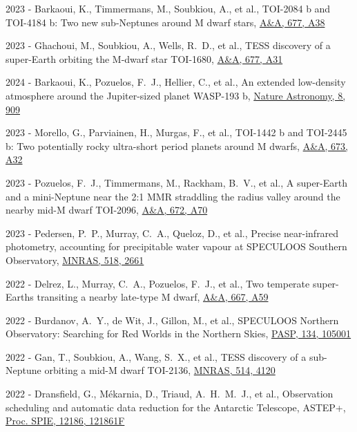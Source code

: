 \documentclass[10pt,letterpaper]{article}
\newcommand{\publi}[4]{\item #1 - #3, #2, #4}
\newcommand{\mnras}{MNRAS}
\newcommand{\aap}{A\&A}
\newcommand{\procspie}{Proc. SPIE}
\newcommand{\pasp}{PASP}
\begin{document}
\begin{etaremune}
    \publi{2023}{TOI-2084 b and TOI-4184 b: Two new sub-Neptunes around M dwarf stars}
    {Barkaoui, K., Timmermans, M., Soubkiou, A., et al.}
    {\href{https://ui.adsabs.harvard.edu/abs/2023A\&A...677A..38B}{\aap, 677, A38}}
    
    \publi{2023}{TESS discovery of a super-Earth orbiting the M-dwarf star TOI-1680}
    {Ghachoui, M., Soubkiou, A., Wells, R.~D., et al.}
    {\href{https://ui.adsabs.harvard.edu/abs/2023A\&A...677A..31G}{\aap, 677, A31}}
    
    \publi{2024}{An extended low-density atmosphere around the Jupiter-sized planet WASP-193 b}
    {Barkaoui, K., Pozuelos, F.~J., Hellier, C., et al.}
    {\href{https://ui.adsabs.harvard.edu/abs/2024NatAs...8..909B}{Nature Astronomy, 8, 909}}
        
    \publi{2023}{TOI-1442 b and TOI-2445 b: Two potentially rocky ultra-short period planets around M dwarfs}
    {Morello, G., Parviainen, H., Murgas, F., et al.}
    {\href{https://ui.adsabs.harvard.edu/abs/2023A\&A...673A..32M}{\aap, 673, A32}}
    
    \publi{2023}{A super-Earth and a mini-Neptune near the 2:1 MMR straddling the radius valley around the nearby mid-M dwarf TOI-2096}
    {Pozuelos, F.~J., Timmermans, M., Rackham, B.~V., et al.}
    {\href{https://ui.adsabs.harvard.edu/abs/2023A\&A...672A..70P}{\aap, 672, A70}}
    
    \publi{2023}{Precise near-infrared photometry, accounting for precipitable water vapour at SPECULOOS Southern Observatory}
    {Pedersen, P.~P., Murray, C.~A., Queloz, D., et al.}
    {\href{https://ui.adsabs.harvard.edu/abs/2023MNRAS.518.2661P}{\mnras, 518, 2661}}
    
    \publi{2022}{Two temperate super-Earths transiting a nearby late-type M dwarf}
    {Delrez, L., Murray, C.~A., Pozuelos, F.~J., et al.}
    {\href{https://ui.adsabs.harvard.edu/abs/2022A\&A...667A..59D}{\aap, 667, A59}}
    
    \publi{2022}{SPECULOOS Northern Observatory: Searching for Red Worlds in the Northern Skies}
    {Burdanov, A.~Y., de Wit, J., Gillon, M., et al.}
    {\href{https://ui.adsabs.harvard.edu/abs/2022PASP..134j5001B}{\pasp, 134, 105001}}
    
    \publi{2022}{TESS discovery of a sub-Neptune orbiting a mid-M dwarf TOI-2136}
    {Gan, T., Soubkiou, A., Wang, S.~X., et al.}
    {\href{https://ui.adsabs.harvard.edu/abs/2022MNRAS.514.4120G}{\mnras, 514, 4120}}
    
    \publi{2022}{Observation scheduling and automatic data reduction for the Antarctic Telescope, ASTEP+}
    {Dransfield, G., M{\'e}karnia, D., Triaud, A.~H.~M.~J., et al.}
    {\href{https://ui.adsabs.harvard.edu/abs/2022SPIE12186E..1FD}{\procspie, 12186, 121861F}}
    

\end{etaremune}
\end{document}
